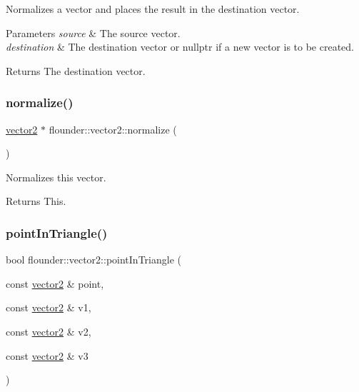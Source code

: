 Normalizes a vector and places the result in the destination vector. 


\begin{DoxyParams}{Parameters}
{\em source} & The source vector. \\
\hline
{\em destination} & The destination vector or nullptr if a new vector is to be created. \\
\hline
\end{DoxyParams}
\begin{DoxyReturn}{Returns}
The destination vector. 
\end{DoxyReturn}
\mbox{\label{classflounder_1_1vector2_a6b47b4d4a39f7a3465e03ee74299ebbe}} 
\subsubsection{\texorpdfstring{normalize()}{normalize()}\hspace{0.1cm}{\footnotesize\ttfamily [2/2]}}
{\footnotesize\ttfamily \hyperlink{classflounder_1_1vector2}{vector2} $\ast$ flounder\+::vector2\+::normalize (\begin{DoxyParamCaption}{ }\end{DoxyParamCaption})}



Normalizes this vector. 

\begin{DoxyReturn}{Returns}
This. 
\end{DoxyReturn}
\mbox{\label{classflounder_1_1vector2_a99be81b66c5723b8a163046a07f55765}} 
\subsubsection{\texorpdfstring{point\+In\+Triangle()}{pointInTriangle()}}
{\footnotesize\ttfamily bool flounder\+::vector2\+::point\+In\+Triangle (\begin{DoxyParamCaption}\item[{const \hyperlink{classflounder_1_1vector2}{vector2} \&}]{point,  }\item[{const \hyperlink{classflounder_1_1vector2}{vector2} \&}]{v1,  }\item[{const \hyperlink{classflounder_1_1vector2}{vector2} \&}]{v2,  }\item[{const \hyperlink{classflounder_1_1vector2}{vector2} \&}]{v3 }\end{DoxyParamCaption})\hspace{0.3cm}{\ttfamily [static]}}



